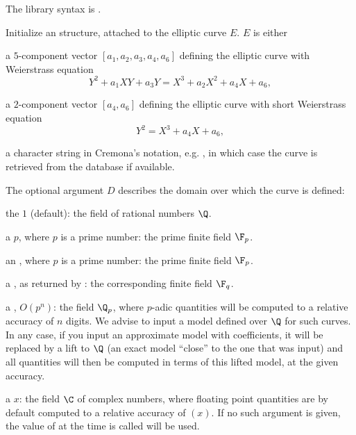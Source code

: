 The library syntax is .

\label{se:ellinit}
Initialize an  structure, attached to the elliptic curve $E$.
$E$ is either

\item a $5$-component vector $[a_1,a_2,a_3,a_4,a_6]$ defining the elliptic
curve with Weierstrass equation
$$ Y^2 + a_1 XY + a_3 Y = X^3 + a_2 X^2 + a_4 X + a_6, $$

\item a $2$-component vector $[a_4,a_6]$ defining the elliptic
curve with short Weierstrass equation
$$ Y^2 = X^3 + a_4 X + a_6, $$

\item a character string in Cremona's notation, e.g. , in which
case the curve is retrieved from the  database if available.

The optional argument $D$ describes the domain over which the curve is
defined:

\item the  $1$ (default): the field of rational numbers $\Q$.

\item a  $p$, where $p$ is a prime number: the prime finite field
$\F_p$.

\item an  , where $p$ is a prime number: the
prime finite field $\F_p$.

\item a , as returned by : the corresponding finite
field $\F_q$.

\item a , $O(p^n)$: the field $\Q_p$, where $p$-adic quantities
will be computed to a relative accuracy of $n$ digits. We advise to input a
model defined over $\Q$ for such curves. In any case, if you input an
approximate model with  coefficients, it will be replaced by a lift
to $\Q$ (an exact model ``close'' to the one that was input) and all quantities
will then be computed in terms of this lifted model, at the given accuracy.

\item a  $x$: the field $\C$ of complex numbers, where floating
point quantities are by default computed to a relative accuracy of
$(x)$. If no such argument is given, the value of
 at the time  is called will be used.

